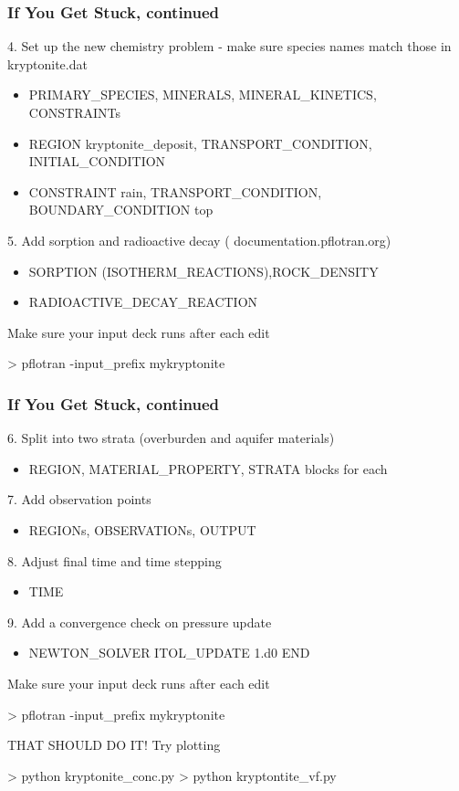 \documentclass{beamer}
\newcommand\redcomment[1]{{{\color{red} #1}}}
\newcommand\bluecomment[1]{{{\color{blue} #1}}}
\newcommand\greencomment[1]{{{\color{green} #1}}}
\begin{document}
\begin{frame}[fragile]\frametitle{If You Get Stuck, continued}
4. Set up the new chemistry problem - make sure species names match those in \greencomment{kryptonite.dat}
\begin{itemize}\small
  \item{PRIMARY\_SPECIES, MINERALS, MINERAL\_KINETICS, CONSTRAINTs}
  \item{REGION kryptonite\_deposit, TRANSPORT\_CONDITION, INITIAL\_CONDITION}
  \item{CONSTRAINT rain, TRANSPORT\_CONDITION, BOUNDARY\_CONDITION top}
\end{itemize}
5. Add sorption and radioactive decay (\bluecomment{documentation.pflotran.org})
\begin{itemize}\small
  \item{SORPTION (ISOTHERM\_REACTIONS),ROCK\_DENSITY}
  \item{RADIOACTIVE\_DECAY\_REACTION}
\end{itemize}
Make sure your input deck runs after each edit
\begin{semiverbatim}
  > pflotran -input\_prefix mykryptonite
\end{semiverbatim}
\end{frame}

\begin{frame}[fragile]\frametitle{If You Get Stuck, continued}
6. Split into two strata (overburden and aquifer materials)
\begin{itemize}\small
  \item{REGION, MATERIAL\_PROPERTY, STRATA blocks for each}
\end{itemize}
7. Add observation points
\begin{itemize}\small
  \item{REGIONs, OBSERVATIONs, OUTPUT}
\end{itemize}
8. Adjust final time and time stepping
\begin{itemize}\small
  \item{TIME}
\end{itemize}
9. Add a convergence check on pressure update
\begin{itemize}\small
  \item{NEWTON\_SOLVER ITOL\_UPDATE 1.d0 END}
\end{itemize}
Make sure your input deck runs after each edit
\begin{semiverbatim}
  > pflotran -input\_prefix mykryptonite
\end{semiverbatim}
\redcomment{THAT SHOULD DO IT!} Try plotting
\begin{semiverbatim}
  > python kryptonite_conc.py
  > python kryptontite_vf.py
\end{semiverbatim}

\end{frame}
\end{document}
